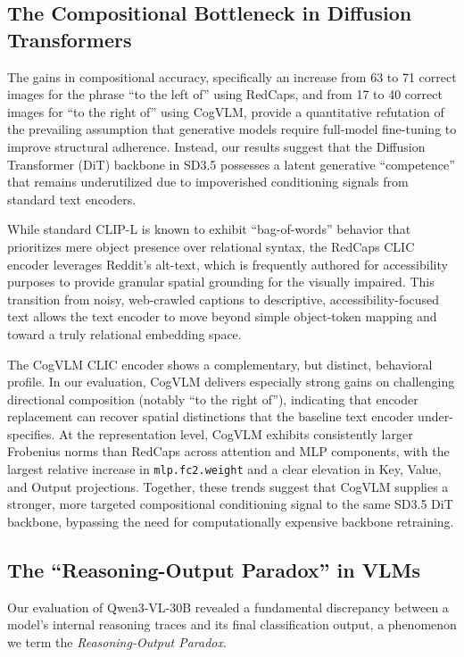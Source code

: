 \subsection{The Compositional Bottleneck in Diffusion Transformers}
The gains in compositional accuracy, specifically an increase from 63 to 71 correct images for the phrase ``to the left of'' using RedCaps, and from 17 to 40 correct images for ``to the right of'' using CogVLM, provide a quantitative refutation of the prevailing assumption that generative models require full-model fine-tuning to improve structural adherence. Instead, our results suggest that the Diffusion Transformer (DiT) backbone in SD3.5 possesses a latent generative ``competence'' that remains underutilized due to impoverished conditioning signals from standard text encoders.

While standard CLIP-L is known to exhibit ``bag-of-words'' behavior that prioritizes mere object presence over relational syntax, the RedCaps CLIC encoder leverages Reddit’s alt-text, which is frequently authored for accessibility purposes to provide granular spatial grounding for the visually impaired. This transition from noisy, web-crawled captions to descriptive, accessibility-focused text allows the text encoder to move beyond simple object-token mapping and toward a truly relational embedding space.

The CogVLM CLIC encoder shows a complementary, but distinct, behavioral profile. In our evaluation, CogVLM delivers especially strong gains on challenging directional composition (notably ``to the right of''), indicating that encoder replacement can recover spatial distinctions that the baseline text encoder under-specifies. At the representation level, CogVLM exhibits consistently larger Frobenius norms than RedCaps across attention and MLP components, with the largest relative increase in \texttt{mlp.fc2.weight} and a clear elevation in Key, Value, and Output projections. Together, these trends suggest that CogVLM supplies a stronger, more targeted compositional conditioning signal to the same SD3.5 DiT backbone, bypassing the need for computationally expensive backbone retraining.

\subsection{The ``Reasoning-Output Paradox'' in VLMs}
Our evaluation of Qwen3-VL-30B revealed a fundamental discrepancy between a model's internal reasoning traces and its final classification output, a phenomenon we term the \textit{Reasoning-Output Paradox}.

